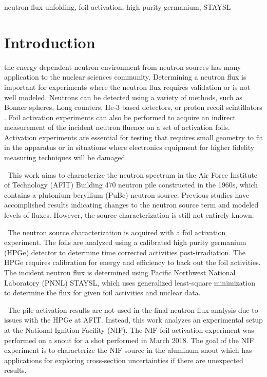 \documentclass[journal]{IEEEtran}
\begin{document}
	\begin{IEEEkeywords}
		neutron flux unfolding, foil activation, high purity germanium, STAYSL 
	\end{IEEEkeywords}
	
	\IEEEpeerreviewmaketitle
	
	\section{Introduction}
	 the energy dependent neutron environment from neutron sources has many application to the nuclear sciences community. 
Determining a neutron flux is important for experiments where the neutron flux requires validation or is not well modeled. 
Neutrons can be detected using a variety of methods, such as Bonner spheres, Long counters, He-3 based detectors, or proton recoil scintillators \cite{Knoll}. 
Foil activation experiments can also be performed to acquire an indirect measurement of the incident neutron fluence on a set of activation foils. 
Activation experiments are essential for testing that requires small geometry to fit in the apparatus or in situations where electronics equipment for higher fidelity measuring techniques will be damaged. 
	
	\ This work aims to characterize the neutron spectrum in the Air Force Institute of Technology (AFIT) Building 470 neutron pile constructed in the 1960s, which contains a plutonium-beryllium (PuBe) neutron source\cite{NETF}. 
Previous studies have accomplished results indicating changes to the neutron source term and modeled levels of fluxes\cite{Bevins,Will}. 
However, the source characterization is still not entirely known. 
	
	\ The neutron source characterization is acquired with a foil activation experiment. 
The foils are analyzed using a calibrated high purity germanium (HPGe) detector to determine time corrected activities post-irradiation. 
The HPGe requires calibration for energy and efficiency to back out the foil activities. 
The incident neutron flux is determined using Pacific Northwest National Laboratory (PNNL) STAYSL, which uses generalized least-square minimization to determine the flux for given foil activities and nuclear data.
	
	\ The pile activation results are not used in the final neutron flux analysis due to issues with the HPGe at AFIT. 
Instead, this work analyzes an experimental setup at the National Ignition Facility (NIF). 
The NIF foil activation experiment was performed on a snout for a shot performed in March 2018\cite{Bogetic}. 
The goal of the NIF experiment is to characterize the NIF source in the aluminum snout which has applications for exploring  cross-section uncertainties if there are unexpected results. 
\end{document}
